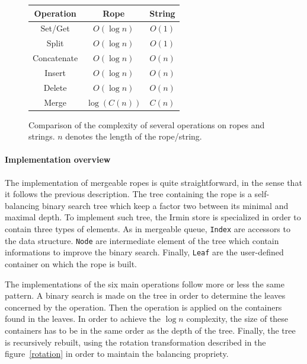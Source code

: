 \documentclass{article}
\renewcommand{\-}{\hyp}
\newcommand{\irmin}{Irmin\xspace}
\newcommand{\code}[1]{\texttt{#1}}
\begin{document}
\begin{figure}[hbt]
\centering
\setlength{\tabcolsep}{1cm}
\begin{tabular}{|c|c|c|}
\hline
	Operation &
	Rope &
	String \\
\hline
	Set/Get &
	\cellcolor{butter!20} $O(\log n)$ &
	\cellcolor{chameleon!20} $O(1)$ \\
\hline
	Split &
	\cellcolor{butter!20} $O(\log n)$ &
	\cellcolor{chameleon!20} $O(1)$ \\
\hline
	Concatenate &
	\cellcolor{butter!20} $O(\log n)$ &
	\cellcolor{scarletred!20} $O(n)$ \\
\hline
	Insert &
	\cellcolor{butter!20} $O(\log n)$ &
	\cellcolor{scarletred!20} $O(n)$ \\
\hline
	Delete &
	\cellcolor{butter!20} $O(\log n)$ &
	\cellcolor{scarletred!20} $O(n)$ \\
\hline
\hline
	Merge &
	\cellcolor{chameleon!20} $\log\left(C(n)\right)$ &
	\cellcolor{butter!20} $C(n)$ \\
\hline
\end{tabular}
\caption{Comparison of the complexity of several operations on ropes and strings. $n$ denotes the length of the rope/string.}
\label{complexity}
\end{figure}

\paragraph{Implementation overview}
The implementation of mergeable ropes is quite straightforward, in the sense that it follows the previous description.
The tree containing the rope is a self-balancing binary search tree which keep a factor two between its minimal and maximal depth.
To implement such tree, the \irmin store is specialized in order to contain three types of elements.
As in mergeable queue, \code{Index} are accessors to the data structure.
\code{Node} are intermediate element of the tree which contain informations to improve the binary search.
Finally, \code{Leaf} are the user-defined container on which the rope is built.

The implementations of the six main operations follow more or less the same pattern.
A binary search is made on the tree in order to determine the leaves concerned by the operation.
Then the operation is applied on the containers found in the leaves.
In order to achieve the $\log n$ complexity, the size of these containers has to be in the same order as the depth of the tree.
Finally, the tree is recursively rebuilt, using the rotation transformation described in the figure~\ref{rotation} in order to maintain the balancing propriety.
\end{document}
